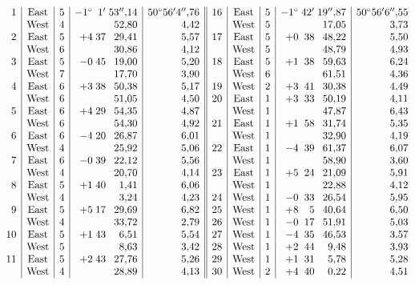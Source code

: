 {\small
\setlength{\arraycolsep}{3.2pt}
\renewcommand{\arraystretch}{1.06}
\[
\begin{array}{@{}r|c|c|r@{\;}r@{\;}r|r||r|c|c|r@{\;}r@{\;}r|r@{}}
1&\text{East}&5&-1^\circ&1'&53''{,}14&50^\circ56'4''{,}76&
16&\text{East}&5&-1^\circ&42'&19''{,}87&50^\circ56'6''{,}55\\
&\text{West}&4&&&52{,}80&4{,}42&&\text{West}&5&&&17{,}05&3{,}73\\
2&\text{East}&5&+4&37&29{,}41&5{,}57&17&\text{East}&5&+0&38&48{,}22&5{,}50\\
&\text{West}&6&&&30{,}86&4{,}12&&\text{West}&5&&&48{,}79&4{,}93\\
3&\text{East}&5&-0&45&19{,}00&5{,}20&18&\text{East}&5&+1&38&59{,}63&6{,}24\\
&\text{West}&7&&&17{,}70&3{,}90&&\text{West}&6&&&61{,}51&4{,}36\\
4&\text{East}&6&+3&38&50{,}38&5{,}17&19&\text{West}&2&+3&41&30{,}38&4{,}49\\
&\text{West}&6&&&51{,}05&4{,}50&20&\text{East}&1&+3&33&50{,}19&4{,}11\\
5&\text{East}&6&+4&29&54{,}35&4{,}87&&\text{West}&1&&&47{,}87&6{,}43\\
&\text{West}&6&&&54{,}30&4{,}92&21&\text{East}&1&+1&58&31{,}74&5{,}35\\
6&\text{East}&6&-4&20&26{,}87&6{,}01&&\text{West}&1&&&32{,}90&4{,}19\\
&\text{West}&4&&&25{,}92&5{,}06&22&\text{East}&1&-4&39&61{,}37&6{,}07\\
7&\text{East}&6&-0&39&22{,}12&5{,}56&&\text{West}&1&&&58{,}90&3{,}60\\
&\text{West}&4&&&20{,}70&4{,}14&23&\text{East}&1&+5&24&21{,}09&5{,}91\\
8&\text{East}&5&+1&40&1{,}41&6{,}06&&\text{West}&1&&&22{,}88&4{,}12\\
&\text{West}&4&&&3{,}24&4{,}23&24&\text{West}&1&-0&33&26{,}54&5{,}95\\
9&\text{East}&5&+5&17&29{,}69&6{,}82&25&\text{West}&1&+8&5&40{,}64&6{,}50\\
&\text{West}&4&&&33{,}72&2{,}79&26&\text{West}&1&-0&17&51{,}91&5{,}03\\
10&\text{East}&5&+1&43&6{,}51&5{,}54&27&\text{West}&1&-4&35&46{,}53&3{,}57\\
&\text{West}&5&&&8{,}63&3{,}42&28&\text{West}&1&+2&44&9{,}48&3{,}93\\
11&\text{East}&5&+2&43&27{,}76&5{,}26&29&\text{West}&1&+1&31&5{,}78&5{,}28\\
&\text{West}&4&&&28{,}89&4{,}13&30&\text{West}&2&+4&40&0{,}22&4{,}51\\

\end{array}\]}
